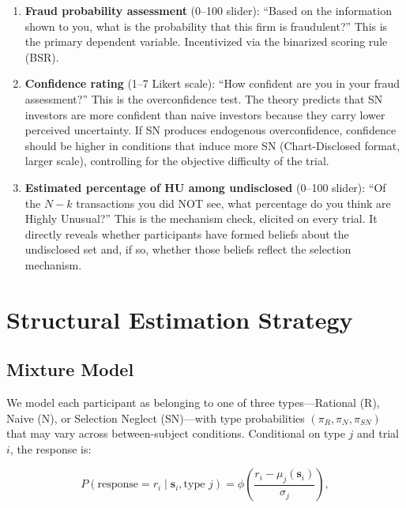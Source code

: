 \documentclass[12pt]{article}
\theoremstyle{definition}
\begin{document}
\begin{enumerate}

\item \textbf{Fraud probability assessment} (0--100 slider): ``Based on the information shown to you, what is the probability that this firm is fraudulent?'' This is the primary dependent variable. Incentivized via the binarized scoring rule (BSR).

\item \textbf{Confidence rating} (1--7 Likert scale): ``How confident are you in your fraud assessment?'' This is the overconfidence test. The theory predicts that SN investors are more confident than naive investors because they carry lower perceived uncertainty. If SN produces endogenous overconfidence, confidence should be higher in conditions that induce more SN (Chart-Disclosed format, larger scale), controlling for the objective difficulty of the trial.

\item \textbf{Estimated percentage of HU among undisclosed} (0--100 slider): ``Of the $N-k$ transactions you did NOT see, what percentage do you think are Highly Unusual?'' This is the mechanism check, elicited on every trial. It directly reveals whether participants have formed beliefs about the undisclosed set and, if so, whether those beliefs reflect the selection mechanism.

\end{enumerate}


\section{Structural Estimation Strategy}
\label{sec:structural}

\subsection{Mixture Model}

We model each participant as belonging to one of three types---Rational (R), Naive (N), or Selection Neglect (SN)---with type probabilities $(\pi_R, \pi_N, \pi_{SN})$ that may vary across between-subject conditions. Conditional on type $j$ and trial $i$, the response is:

\begin{equation}
P(\text{response} = r_i \mid \mathbf{s}_i, \text{type } j) = \phi\left(\frac{r_i - \mu_j(\mathbf{s}_i)}{\sigma_j}\right),
\label{eq:mixture}
\end{equation}
\end{document}
